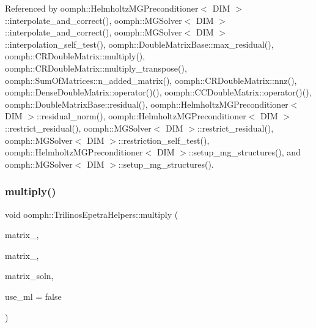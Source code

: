 Referenced by oomph\+::\+Helmholtz\+M\+G\+Preconditioner$<$ D\+I\+M $>$\+::interpolate\+\_\+and\+\_\+correct(), oomph\+::\+M\+G\+Solver$<$ D\+I\+M $>$\+::interpolate\+\_\+and\+\_\+correct(), oomph\+::\+M\+G\+Solver$<$ D\+I\+M $>$\+::interpolation\+\_\+self\+\_\+test(), oomph\+::\+Double\+Matrix\+Base\+::max\+\_\+residual(), oomph\+::\+C\+R\+Double\+Matrix\+::multiply(), oomph\+::\+C\+R\+Double\+Matrix\+::multiply\+\_\+transpose(), oomph\+::\+Sum\+Of\+Matrices\+::n\+\_\+added\+\_\+matrix(), oomph\+::\+C\+R\+Double\+Matrix\+::nnz(), oomph\+::\+Dense\+Double\+Matrix\+::operator()(), oomph\+::\+C\+C\+Double\+Matrix\+::operator()(), oomph\+::\+Double\+Matrix\+Base\+::residual(), oomph\+::\+Helmholtz\+M\+G\+Preconditioner$<$ D\+I\+M $>$\+::residual\+\_\+norm(), oomph\+::\+Helmholtz\+M\+G\+Preconditioner$<$ D\+I\+M $>$\+::restrict\+\_\+residual(), oomph\+::\+M\+G\+Solver$<$ D\+I\+M $>$\+::restrict\+\_\+residual(), oomph\+::\+M\+G\+Solver$<$ D\+I\+M $>$\+::restriction\+\_\+self\+\_\+test(), oomph\+::\+Helmholtz\+M\+G\+Preconditioner$<$ D\+I\+M $>$\+::setup\+\_\+mg\+\_\+structures(), and oomph\+::\+M\+G\+Solver$<$ D\+I\+M $>$\+::setup\+\_\+mg\+\_\+structures().

\mbox{\label{namespaceoomph_1_1TrilinosEpetraHelpers_a0d96936ed1e5f3266ef06564ae300103}} 
\subsubsection{\texorpdfstring{multiply()}{multiply()}\hspace{0.1cm}{\footnotesize\ttfamily [2/2]}}
{\footnotesize\ttfamily void oomph\+::\+Trilinos\+Epetra\+Helpers\+::multiply (\begin{DoxyParamCaption}\item[{const \hyperlink{classoomph_1_1CRDoubleMatrix}{C\+R\+Double\+Matrix} \&}]{matrix\+\_,  }\item[{const \hyperlink{classoomph_1_1CRDoubleMatrix}{C\+R\+Double\+Matrix} \&}]{matrix\+\_,  }\item[{\hyperlink{classoomph_1_1CRDoubleMatrix}{C\+R\+Double\+Matrix} \&}]{matrix\+\_\+soln,  }\item[{const bool \&}]{use\+\_\+ml = {\ttfamily false} }\end{DoxyParamCaption})}



